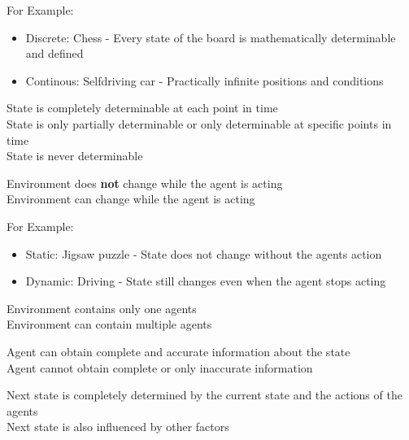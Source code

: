 \documentclass[
../../EiKI_Summary.tex,
]
{subfiles}
\begin{document}
For Example: 
\begin{itemize}
    \item Discrete: Chess - Every state of the board is mathematically determinable and defined
    \item Continous: Selfdriving car - Practically infinite positions and conditions
\end{itemize}

\begin{defbox}
     State is completely determinable at each point in time\\
     State is only partially determinable or only determinable at specific points in time\\
     State is never determinable
\end{defbox}

\begin{defbox}
     Environment does \textbf{not} change while the agent is acting\\
     Environment can change while the agent is acting
\end{defbox}

For Example:
\begin{itemize}
    \item Static: Jigsaw puzzle - State does not change without the agents action
    \item Dynamic: Driving - State still changes even when the agent stops acting
\end{itemize}

\begin{defbox}
     Environment contains only one agents\\
     Environment can contain multiple agents
\end{defbox}

\begin{defbox}
     Agent can obtain complete and accurate information about the state\\
     Agent cannot obtain complete or only inaccurate information
\end{defbox}

\begin{defbox}
     Next state is completely determined by the current state and the actions of the agents\\
     Next state is also influenced by other factors
\end{defbox}
\end{document}

